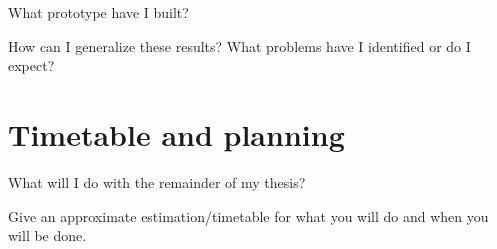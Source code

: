 \documentclass[11pt]{article}
\begin{document}
What prototype have I built? \cite{duregaard2013feat, claessen2010quickspec}

How can I generalize these results? What problems have I identified or
do I expect? \cite{yakushev2009generic}

\section{Timetable and planning}

What will I do with the remainder of my thesis? \cite{claessen2015generating}

Give an approximate estimation/timetable for what you will do and when you will be done.

\newpage
{}

\end{document}

